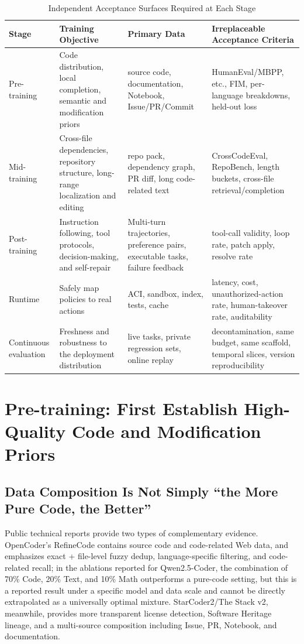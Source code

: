 \documentclass[10pt,a4paper,UTF8,fontset=none]{ctexart}
\begin{document}
\begin{table}[htbp]
\centering
\caption{Independent Acceptance Surfaces Required at Each Stage}
\label{tab:surfaces}
\small
\begin{tabularx}{\textwidth}{p{2.6cm}YYY}
\toprule
Stage & Training Objective & Primary Data & Irreplaceable Acceptance Criteria \\
\midrule
Pre-training & Code distribution, local completion, semantic and modification priors & source code, documentation, Notebook, Issue/PR/Commit & HumanEval/MBPP, etc., FIM, per-language breakdowns, held-out loss \\
Mid-training & Cross-file dependencies, repository structure, long-range localization and editing & repo pack, dependency graph, PR diff, long code-related text & CrossCodeEval, RepoBench, length buckets, cross-file retrieval/completion \\
Post-training & Instruction following, tool protocols, decision-making, and self-repair & Multi-turn trajectories, preference pairs, executable tasks, failure feedback & tool-call validity, loop rate, patch apply, resolve rate \\
Runtime & Safely map policies to real actions & ACI, sandbox, index, tests, cache & latency, cost, unauthorized-action rate, human-takeover rate, auditability \\
Continuous evaluation & Freshness and robustness to the deployment distribution & live tasks, private regression sets, online replay & decontamination, same budget, same scaffold, temporal slices, version reproducibility \\
\bottomrule
\end{tabularx}
\end{table}

\section{Pre-training: First Establish High-Quality Code and Modification Priors}

\subsection{Data Composition Is Not Simply ``the More Pure Code, the Better''}

Public technical reports provide two types of complementary evidence. OpenCoder's RefineCode contains source code and code-related Web data, and emphasizes exact + file-level fuzzy dedup, language-specific filtering, and code-related recall\cite{huang2024opencoder}; in the ablations reported for Qwen2.5-Coder, the combination of 70\% Code, 20\% Text, and 10\% Math outperforms a pure-code setting, but this is a reported result under a specific model and data scale and cannot be directly extrapolated as a universally optimal mixture\cite{hui2024qwen25coder}. StarCoder2/The Stack v2, meanwhile, provides more transparent license detection, Software Heritage lineage, and a multi-source composition including Issue, PR, Notebook, and documentation\cite{lozhkov2024starcoder2}.
\end{document}
